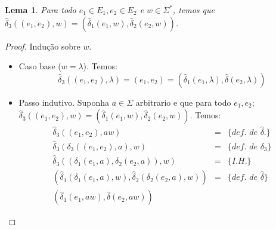 \documentclass[a4paper]{article}
\newtheorem{Lemma}{Lema}
\theoremstyle{definition}
\begin{document}
  \begin{Lemma}\label{lemma1}
    Para todo $e_1 \in E_1, e_2\in E_2$ e $w \in \Sigma^*$, temos que
    $\widehat{\delta}_3((e_1,e_2), w) = (\widehat{\delta}_1(e_1,w),\widehat{\delta}_2(e_2,w))$.
  \end{Lemma}
  \begin{proof} Indução sobre $w$.
    \begin{itemize}
       \item Caso base ($w=\lambda$). Temos:
         \[
           \widehat{\delta}_3((e_1,e_2), \lambda) = (e_1,e_2) = (\widehat{\delta}_1(e_1,\lambda),\widehat{\delta}(e_2,\lambda))
         \]
       \item Passo indutivo. Suponha $a\in\Sigma$ arbitrario e que para todo $e_1,e_2$;
         $\widehat{\delta}_3((e_1,e_2), w) =
         (\widehat{\delta}_1(e_1,w),\widehat{\delta}_2(e_2,w))$.
         Temos:
         \[
           \begin{array}{lcl}
             \widehat{\delta}_3((e_1,e_2), aw) & = & \{\textit{def. de
                                                     }\widehat{\delta}.\}\\
             \widehat{\delta}_3(\delta_3((e_1,e_2),a),w) & = &
                                                               \{\textit{def. de
                                                               }\delta_3\}\\
             \widehat{\delta}_3((\delta_1(e_1,a),\delta_2(e_2,a)),w) & = &
                                                                           \{\textit{I.H.}\}\\
             (\widehat{\delta}_1(\delta_1(e_1,a),w),\widehat{\delta}_2(\delta_2(e_2,a),w))
                                               & = & \{\textit{def. de
                                                     }\widehat{\delta}\} \\
             (\widehat{\delta}_1(e_1,aw),\widehat{\delta}(e_2,aw))
           \end{array}
         \]
    \end{itemize}
  \end{proof}
\end{document}
